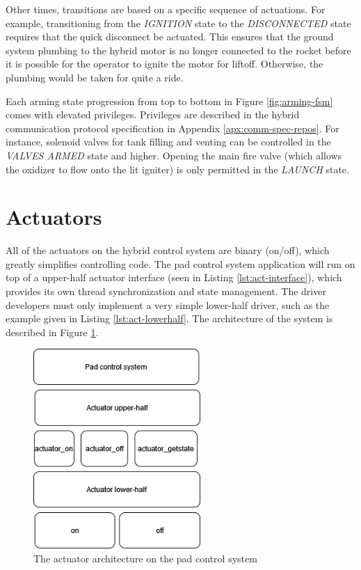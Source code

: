 Other times, transitions are based on a specific sequence of actuations. For example, transitioning from the
\textit{IGNITION} state to the \textit{DISCONNECTED} state requires that the quick disconnect be actuated. This ensures
that the ground system plumbing to the hybrid motor is no longer connected to the rocket before it is possible for the
operator to ignite the motor for liftoff. Otherwise, the plumbing would be taken for quite a ride.

Each arming state progression from top to bottom in Figure \ref{fig:arming-fsm} comes with elevated privileges.
Privileges are described in the hybrid communication protocol specification in Appendix \ref{apx:comm-spec-repos}. For
instance, solenoid valves for tank filling and venting can be controlled in the \textit{VALVES ARMED} state and higher.
\cite{hybrid-comms} Opening the main fire valve (which allows the oxidizer to flow onto the lit igniter) is only
permitted in the \textit{LAUNCH} state.

\section{Actuators}

All of the actuators on the hybrid control system are binary (on/off), which greatly simplifies controlling code. The
pad control system application will run on top of a upper-half actuator interface (seen in Listing
\ref{lst:act-interface}), which provides its own thread synchronization and state management. The driver developers must
only implement a very simple lower-half driver, such as the example given in Listing \ref{lst:act-lowerhalf}. The
architecture of the system is described in Figure \ref{fig:pad-architecture}.

\begin{figure}[H]
    \centering
    \includegraphics[width=2.5in]{assets/diagrams/Pad Actuator Architecture.png}
    \caption{The actuator architecture on the pad control system}
    \label{fig:pad-architecture}
\end{figure}

